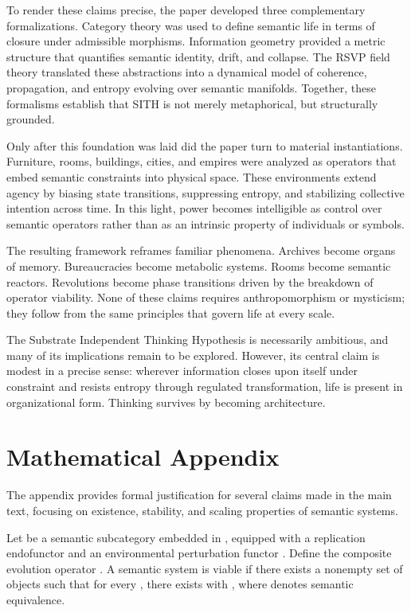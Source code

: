\documentclass[11pt,oneside]{article}
\begin{document}
To render these claims precise, the paper developed three complementary formalizations. Category theory was used to define semantic life in terms of closure under admissible morphisms. Information geometry provided a metric structure that quantifies semantic identity, drift, and collapse. The RSVP field theory translated these abstractions into a dynamical model of coherence, propagation, and entropy evolving over semantic manifolds. Together, these formalisms establish that SITH is not merely metaphorical, but structurally grounded.

Only after this foundation was laid did the paper turn to material instantiations. Furniture, rooms, buildings, cities, and empires were analyzed as operators that embed semantic constraints into physical space. These environments extend agency by biasing state transitions, suppressing entropy, and stabilizing collective intention across time. In this light, power becomes intelligible as control over semantic operators rather than as an intrinsic property of individuals or symbols.

The resulting framework reframes familiar phenomena. Archives become organs of memory. Bureaucracies become metabolic systems. Rooms become semantic reactors. Revolutions become phase transitions driven by the breakdown of operator viability. None of these claims requires anthropomorphism or mysticism; they follow from the same principles that govern life at every scale.

The Substrate Independent Thinking Hypothesis is necessarily ambitious, and many of its implications remain to be explored. However, its central claim is modest in a precise sense: wherever information closes upon itself under constraint and resists entropy through regulated transformation, life is present in organizational form. Thinking survives by becoming architecture.

\appendix \section{Mathematical Appendix} 

The appendix provides formal justification for several claims made in the main text, focusing on existence, stability, and scaling properties of semantic systems.

Let be a semantic subcategory embedded in , equipped with a replication endofunctor and an environmental perturbation functor . Define the composite evolution operator . A semantic system is viable if there exists a nonempty set of objects such that for every , there exists with , where denotes semantic equivalence.
\end{document}
